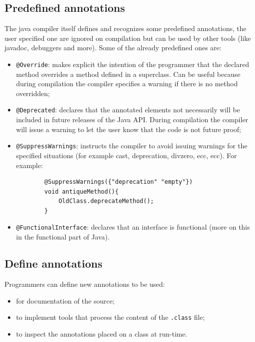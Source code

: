 \subsection{Predefined annotations}
The java compiler itself defines and recognizes some predefined annotations, the user specified one are ignored on compilation but can be used by other tools (like javadoc, debuggers and more).
Some of the already predefined ones are:
\begin{itemize}
    \item \verb|@Override|: makes explicit the intention of the programmer that the declared method overrides a method defined in a superclass.
    Can be useful because during compilation the compiler specifies a warning if there is no method overridden;
    
    \item \verb|@Deprecated|: declares that the annotated elements not necessarily will be included in future releases of the Java API.
    During compilation the compiler will issue a warning to let the user know that the code is not future proof;
    
    \item \verb|@SuppressWarnings|: instructs the compiler to avoid issuing warnings for the specified situations (for example cast, deprecation, divzero, ecc, ecc).
    For example:
    \begin{verbatim}
        @SuppressWarnings({"deprecation" "empty"})
        void antiqueMethod(){
            OldClass.deprecateMethod();
        }
    \end{verbatim}

    \item \verb|@FunctionalInterface|: declares that an interface is functional (more on this in the functional part of Java).
\end{itemize}

\subsection{Define annotations}
Programmers can define new annotations to be used:
\begin{itemize}
    \item for documentation of the source;
    \item to implement tools that process the content of the \verb|.class| file;
    \item to inspect the annotations placed on a class at run-time.
\end{itemize}


